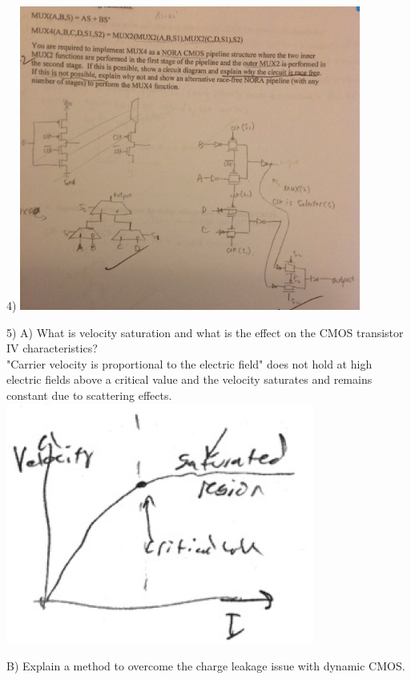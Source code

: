 \documentclass[9pt,fleqn]{article}
\begin{document}
\begin{multicols}{3}
    4) \includegraphics[width=\linewidth,height=10cm, width=7cm]{question4.png}

    5)
        A) What is velocity saturation and what is the effect on the CMOS transistor
           IV characteristics? \\

           "Carrier velocity is proportional to the electric field" does not hold
           at high electric fields above a critical value and the velocity saturates
           and remains constant due to scattering effects.
            \includegraphics[width=\linewidth]{ques5a.png}

        B) Explain a method to overcome the charge leakage issue with dynamic CMOS.


\end{multicols}
\end{document}
